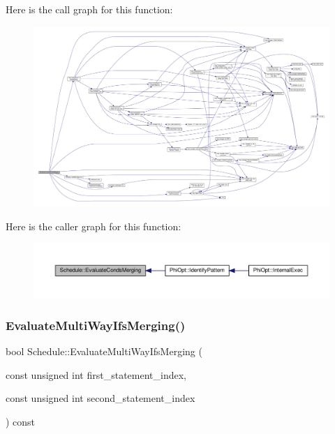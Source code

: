 Here is the call graph for this function\+:
\nopagebreak
\begin{figure}[H]
\begin{center}
\leavevmode
\includegraphics[width=350pt]{df/d61/classSchedule_a65ecdc45dd59e27c5226bc34c16617dd_cgraph}
\end{center}
\end{figure}
Here is the caller graph for this function\+:
\nopagebreak
\begin{figure}[H]
\begin{center}
\leavevmode
\includegraphics[width=350pt]{df/d61/classSchedule_a65ecdc45dd59e27c5226bc34c16617dd_icgraph}
\end{center}
\end{figure}
\mbox{\label{classSchedule_a735a5c3680d2fac0b2de19e734bc8a96}} 
\subsubsection{\texorpdfstring{Evaluate\+Multi\+Way\+Ifs\+Merging()}{EvaluateMultiWayIfsMerging()}}
{\footnotesize\ttfamily bool Schedule\+::\+Evaluate\+Multi\+Way\+Ifs\+Merging (\begin{DoxyParamCaption}\item[{const unsigned int}]{first\+\_\+statement\+\_\+index,  }\item[{const unsigned int}]{second\+\_\+statement\+\_\+index }\end{DoxyParamCaption}) const}



